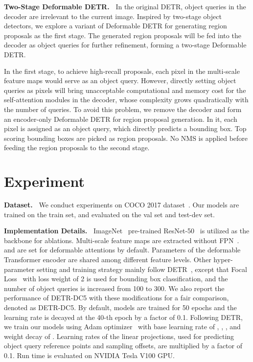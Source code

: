 \documentclass{article}
\begin{document}
\textbf{Two-Stage Deformable DETR.~}
In the original DETR, object queries in the decoder are irrelevant to the current image. Inspired by two-stage object detectors, we explore a variant of Deformable DETR for generating region proposals as the first stage. The generated region proposals will be fed into the decoder as object queries for further refinement, forming a two-stage Deformable DETR.

In the first stage, to achieve high-recall proposals, each pixel in the multi-scale feature maps would serve as an object query. However, directly setting object queries as pixels will bring unacceptable computational and memory cost for the self-attention modules in the decoder, whose complexity grows quadratically with the number of queries. To avoid this problem, we remove the decoder and form an encoder-only Deformable DETR for region proposal generation. In it, each pixel is assigned as an object query, which directly predicts a bounding box. Top scoring bounding boxes are picked as region proposals.
No NMS is applied before feeding the region proposals to the second stage.


 \section{Experiment}

\textbf{Dataset.~} We conduct experiments on COCO 2017 dataset~\citep{lin2014microsoft}. Our models are trained on the train set, and evaluated on the val set and test-dev set.

\textbf{Implementation Details.~} 
ImageNet~\citep{deng2009imagenet} pre-trained ResNet-50~\citep{he2016deep} is utilized as the backbone for ablations. Multi-scale feature maps are extracted without FPN~\citep{lin2017feature}.
 and  are set for deformable attentions by default.
Parameters of the deformable Transformer encoder are shared among different feature levels.
Other hyper-parameter setting and training strategy mainly follow DETR~\citep{carion2020end}, except that Focal Loss~\citep{lin2017focal} with loss weight of 2 is used for bounding box classification, and the number of object queries is increased from 100 to 300.  
We also report the performance of DETR-DC5 with these modifications for a fair comparison, denoted as DETR-DC5. By default, models are trained for 50 epochs and the learning rate is decayed at the 40-th epoch by a factor of 0.1. Following DETR\citep{carion2020end}, we train our models using Adam optimizer~\citep{kingma2014adam} with base learning rate of , , , and weight decay of . 
Learning rates of the linear projections, used for predicting object query reference points and sampling offsets, are multiplied by a factor of 0.1.
Run time is evaluated on NVIDIA Tesla V100 GPU.
\end{document}
